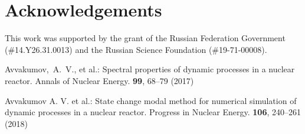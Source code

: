 \documentclass[runningheads]{llncs}
\begin{document}
\section*{Acknowledgements}
This work was supported by the grant of the Russian Federation Government
(\#14.Y26.31.0013) and the Russian Science Foundation (\#19-71-00008).

\begin{thebibliography}{8}
Avvakumov,~A.~V., et al.: Spectral properties of dynamic processes in a nuclear reactor. Annals of Nuclear Energy. \textbf{99}, 68--79 (2017) 

Avvakumov A. V. et al.: State change modal method for numerical simulation of dynamic processes in a nuclear reactor. Progress in Nuclear Energy. \textbf{106}, 240--261 (2018)

\end{thebibliography}
\end{document}
